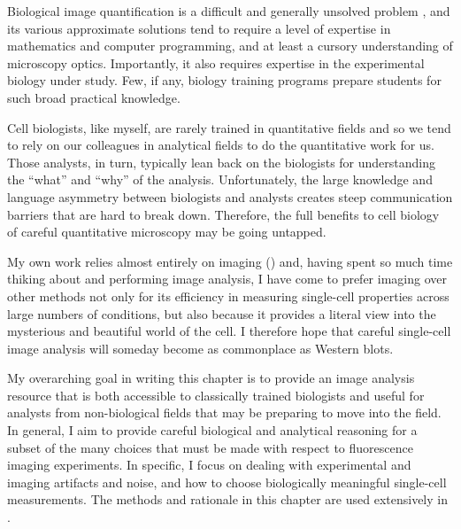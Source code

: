Biological image
quantification is a difficult and generally unsolved problem \cite{Danuser2011},
and its various approximate
solutions tend to require a level of expertise in mathematics
and computer programming, and at least a cursory
understanding of microscopy optics. Importantly, it also requires expertise
in the experimental biology under study. Few, if any, biology training
programs prepare students for such broad practical knowledge.


Cell biologists, like myself,
are rarely trained in quantitative fields
and so we tend to rely on our colleagues
in analytical fields to do the quantitative work for us. Those analysts,
in turn, typically lean back on the biologists for understanding the
``what'' and ``why'' of the analysis.
Unfortunately, the large knowledge and language
asymmetry between biologists and analysts
creates steep communication barriers that are hard to break
down. Therefore, the full benefits to cell biology of careful
quantitative microscopy may be going untapped.


My own work relies almost entirely on imaging ()
and, having spent so much time thiking about and performing image analysis,
I have come to prefer imaging over other methods not only for its efficiency
in measuring single-cell properties across large numbers
of conditions, but also because it provides a literal view into
the mysterious and beautiful world of the cell. I therefore hope that
careful single-cell image analysis will someday become as commonplace as Western
blots.


My overarching goal in writing this chapter is to provide
an image analysis resource that is both accessible
to classically trained biologists
and useful for analysts from non-biological fields
that may be preparing to move into the field. In general, I aim to provide careful
biological and analytical
reasoning for a subset of the many choices that must
be made with respect to
fluorescence imaging experiments. In specific, I focus
on dealing with
experimental and imaging artifacts and noise,
and how to choose biologically meaningful single-cell
measurements. The methods and rationale in this chapter
are used extensively in .














